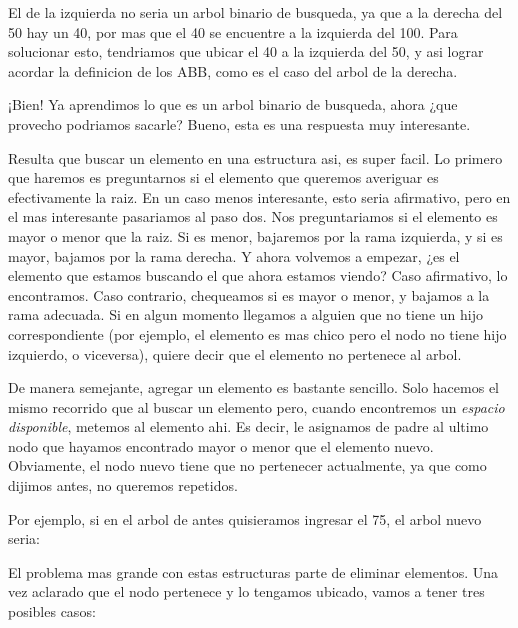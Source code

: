 \documentclass{article}
\begin{document}
\begin{multicols}{2}


\end{multicols}

El de la izquierda no seria un arbol binario de busqueda, ya que a la derecha del 50 hay un 40, por mas que el 40 se encuentre a la izquierda del 100. Para solucionar esto, tendriamos que ubicar el 40 a la izquierda del 50, y asi lograr acordar la definicion de los ABB, como es el caso del arbol de la derecha.

¡Bien! Ya aprendimos lo que es un arbol binario de busqueda, ahora ¿que provecho podriamos sacarle? Bueno, esta es una respuesta muy interesante.

Resulta que buscar un elemento en una estructura asi, es super facil. Lo primero que haremos es preguntarnos si el elemento que queremos averiguar es efectivamente la raiz. En un caso menos interesante, esto seria afirmativo, pero en el mas interesante pasariamos al paso dos. Nos preguntariamos si el elemento es mayor o menor que la raiz. Si es menor, bajaremos por la rama izquierda, y si es mayor, bajamos por la rama derecha. Y ahora volvemos a empezar, ¿es el elemento que estamos buscando el que ahora estamos viendo? Caso afirmativo, lo encontramos. Caso contrario, chequeamos si es mayor o menor, y bajamos a la rama adecuada. Si en algun momento llegamos a alguien que no tiene un hijo correspondiente (por ejemplo, el elemento es mas chico pero el nodo no tiene hijo izquierdo, o viceversa), quiere decir que el elemento no pertenece al arbol.

De manera semejante, agregar un elemento es bastante sencillo. Solo hacemos el mismo recorrido que al buscar un elemento pero, cuando encontremos un \textit{espacio disponible}, metemos al elemento ahi. Es decir, le asignamos de padre al ultimo nodo que hayamos encontrado mayor o menor que el elemento nuevo. Obviamente, el nodo nuevo tiene que no pertenecer actualmente, ya que como dijimos antes, no queremos repetidos.

Por ejemplo, si en el arbol de antes quisieramos ingresar el 75, el arbol nuevo seria:


El problema mas grande con estas estructuras parte de eliminar elementos. Una vez aclarado que el nodo pertenece y lo tengamos ubicado, vamos a tener tres posibles casos:
\end{document}
